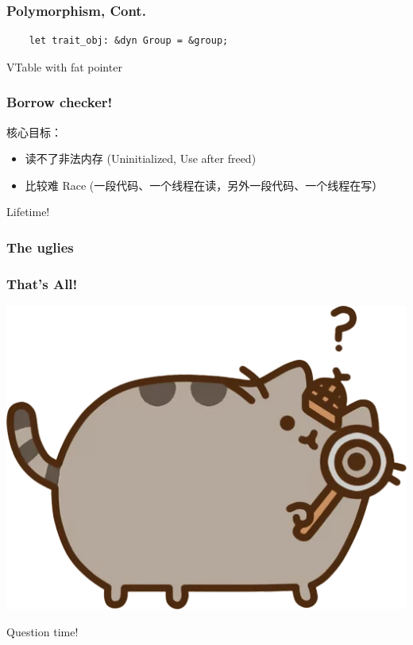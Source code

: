 \documentclass[UTF-8]{ctexbeamer}
\begin{document}
\begin{frame}[fragile]
  \frametitle{Polymorphism, Cont.}

  \begin{verbatim}
    let trait_obj: &dyn Group = &group;
  \end{verbatim}

  \pause
  \vspace{1em}

  VTable with fat pointer
\end{frame}

\begin{frame}
  \frametitle{Borrow checker!}

  核心目标：
  \begin{itemize}
    \item 读不了非法内存 (Uninitialized, Use after freed)
    \item 比较难 Race (一段代码、一个线程在读，另外一段代码、一个线程在写）
  \end{itemize}

  \pause
  \vspace{1em}

  Lifetime!
\end{frame}

\begin{frame}
  \frametitle{The uglies}
\end{frame}

\begin{frame}
  \frametitle{That's All!}

  \begin{center}
    \includegraphics[width=.5\textwidth]{assets/look.png}

    Question time!
  \end{center}
\end{frame}
\end{document}
